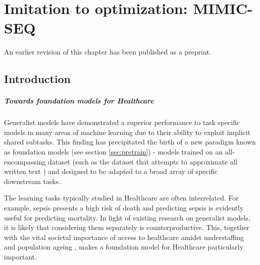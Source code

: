 \chapter{Imitation to optimization: MIMIC-SEQ} \label{ch:mimicseq}

\begin{remark}
    An earlier revision of this chapter \cite{liventsevIntensiveCareOne2024} has been published as a preprint.
\end{remark}

\section{Introduction}

\paragraph{Towards foundation models for Healthcare}

Generalist models have demonstrated a superior performance to task specific models in many areas of machine learning \cite{reedGeneralistAgent2022} due to their ability to exploit implicit shared subtasks. 
This finding has precipitated the birth of a new paradigm known as foundation models (see section \ref{sec:pretrain}) - models trained on an all-encompassing dataset (such as the dataset that attempts to approximate all written text \cite{chelbaOneBillionWord2013}) and designed to be adapted to a broad array of specific downstream tasks.

The learning tasks typically studied in Healthcare are often interrelated. 
For example, sepsis presents a high risk of death \cite{schlichtingRecognizingManagingSevere2007} and predicting sepsis is evidently useful for predicting mortality.
In light of existing research on generalist models, it is likely that considering them separately is counterproductive.
This, together with the vital societal importance of access to healthcare amidst understaffing \cite{ashleyy.metcalfHospitalUnitUnderstaffing2016, hudsonUnderstaffing2015, mercerMessageEditorinChief2008, munnUnderstaffingWardsCompromising2017, r.stanleyUnderstaffedOverwhelmed2010, SurveyShowsHidden1993, thelancetHealthcareSystemStaffing2018, UnderstaffingSignificantIssue2012} and population ageing \cite{2012health, Aslam2021Ageing, L1991aging, Lloyd2012Population, Mahishale2015Ageing, Mann2004aging, Sammy2019global, Suzman2015Health}, makes a foundation model for Healthcare particularly important.

